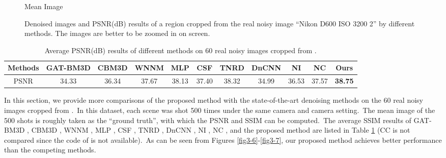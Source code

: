 \begin{figure}
{\begin{minipage}[t]{0.19\textwidth}
{\footnotesize Mean Image}
\end{minipage}
}
    \caption{Denoised images and PSNR(dB) results of a region cropped from the real noisy image ``Nikon D600 ISO 3200 2'' \cite{crosschannel2016} by different methods. The images are better to be zoomed in on screen.}
    \label{fig3-14}
\end{figure}


\begin{table}
\begin{adjustwidth}{-1cm}{}
\scriptsize
\caption{Average PSNR(dB) results of different methods on 60 real noisy images cropped from \cite{crosschannel2016}.}

\label{tab3-4}
\begin{center}
\renewcommand\arraystretch{1}
\begin{tabular}{|c||c|c|c|c|c|c|c|c|c|c|}
\hline
Methods
&\textbf{GAT-BM3D}
&\textbf{CBM3D}
&\textbf{WNNM}
&\textbf{MLP}
&\textbf{CSF} 
&\textbf{TNRD} 
&\textbf{DnCNN}
&\textbf{NI} 
&\textbf{NC} 
&\textbf{Ours} 
\\
\hline
PSNR  
& 34.33 & 36.34 & 37.67 & 38.13 & 37.40 & 38.32 & 34.99 & 36.53 & 37.57 & \textbf{38.75}
\\
\hline
\end{tabular}
\end{center}
\end{adjustwidth}
\end{table}

In this section, we provide more comparisons of the proposed method with the state-of-the-art denoising methods on the 60 real noisy images cropped from \cite{crosschannel2016}.\ In this dataset, each scene was shot 500 times under the same camera and camera setting.\ The mean image of the 500 shots is roughly taken as the ``ground truth'', with which the PSNR and SSIM can be computed.\ The average SSIM results of GAT-BM3D \cite{makitalo2013optimal}, CBM3D \cite{bm3d}, WNNM \cite{wnnm}, MLP \cite{mlp}, CSF \cite{csf}, TNRD \cite{tnrd}, DnCNN \cite{dncnn}, NI \cite{neatimage}, NC \cite{noiseclinic,ncwebsite}, and the proposed method are listed in Table \ref{tab3-4} (CC is not compared since the code of \cite{crosschannel2016} is not available).\ As can be seen from Figures \ref{fig3-6}-\ref{fig3-7}, our proposed method achieves better performance than the competing methods.

